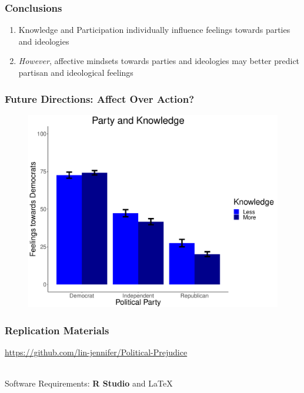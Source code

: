\documentclass[14pt]{beamer}
\newcommand\e{\emph}
\newcommand\tb{\textbf}
\begin{document}
\begin{frame}
\frametitle{Conclusions}
\begin{enumerate}
	\item Knowledge and Participation individually influence feelings towards parties and ideologies
	\item \e{However}, affective mindsets towards parties and ideologies may better predict partisan and ideological feelings
\end{enumerate}
\end{frame}

\begin{frame}
\frametitle{Future Directions: Affect Over Action?}
\begin{center}
	\begin{figure}[ht!]  
		{	 \includegraphics[width=.8\textwidth]{KnowPartyDem}}
	\end{figure}
\end{center}
\end{frame}

\begin{frame}
\frametitle{Replication Materials}
\begin{center}
	\url{https://github.com/lin-jennifer/Political-Prejudice}
	
~~\\
Software Requirements: \tb{R Studio} and \LaTeX

\end{center}
\end{frame}
\end{document}
